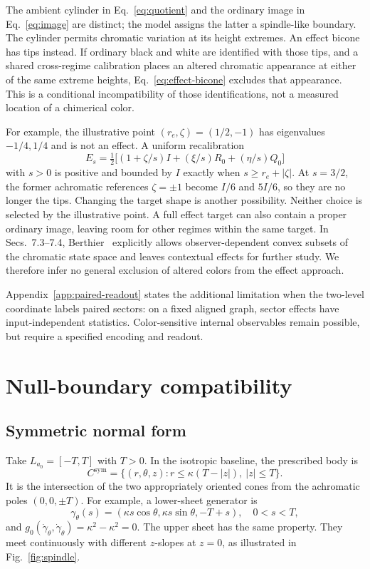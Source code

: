 \documentclass[11pt,letterpaper]{article}
\theoremstyle{plain}
\begin{document}
The ambient cylinder in Eq.~\eqref{eq:quotient} and the ordinary image in Eq.~\eqref{eq:image} are distinct; the model assigns the latter a spindle-like boundary. The cylinder permits chromatic variation at its height extremes. An effect bicone has tips instead. If ordinary black and white are identified with those tips, and a shared cross-regime calibration places an altered chromatic appearance at either of the same extreme heights, Eq.~\eqref{eq:effect-bicone} excludes that appearance. This is a conditional incompatibility of those identifications, not a measured location of a chimerical color.

For example, the illustrative point $(r_e,\zeta)=(1/2,-1)$ has eigenvalues $-1/4,1/4$ and is not an effect. A uniform recalibration
\begin{equation}
 E_s=\tfrac12\bigl[(1+\zeta/s)I+(\xi/s)R_0+(\eta/s)Q_0\bigr]
 \label{eq:effect-recalibration}
\end{equation}
with $s>0$ is positive and bounded by $I$ exactly when $s\geq r_e+|\zeta|$. At $s=3/2$, the former achromatic references $\zeta=\pm1$ become $I/6$ and $5I/6$, so they are no longer the tips. Changing the target shape is another possibility. Neither choice is selected by the illustrative point. A full effect target can also contain a proper ordinary image, leaving room for other regimes within the same target. In Secs.~7.3--7.4, Berthier~\cite{Berthier2020} explicitly allows observer-dependent convex subsets of the chromatic state space and leaves contextual effects for further study. We therefore infer no general exclusion of altered colors from the effect approach.

Appendix~\ref{app:paired-readout} states the additional limitation when the two-level coordinate labels paired sectors: on a fixed aligned graph, sector effects have input-independent statistics. Color-sensitive internal observables remain possible, but require a specified encoding and readout.

\section{Null-boundary compatibility}
\label{sec:constraint}
\subsection{Symmetric normal form}
Take $L_{a_0}=[-T,T]$ with $T>0$. In the isotropic baseline, the prescribed body is
\begin{equation}
 C^{\mathrm{sym}}=\{(r,\theta,z):r\leq\kappa(T-|z|),\ |z|\leq T\}.
 \label{eq:bicone}
\end{equation}
It is the intersection of the two appropriately oriented cones from the achromatic poles $(0,0,\pm T)$. For example, a lower-sheet generator is
\begin{equation}
 \gamma_\theta(s)=(\kappa s\cos\theta,\kappa s\sin\theta,-T+s),
 \quad 0<s<T,
 \label{eq:generator}
\end{equation}
and $g_0(\dot\gamma_\theta,\dot\gamma_\theta)=\kappa^2-\kappa^2=0$. The upper sheet has the same property. They meet continuously with different $z$-slopes at $z=0$, as illustrated in Fig.~\ref{fig:spindle}.
\end{document}
